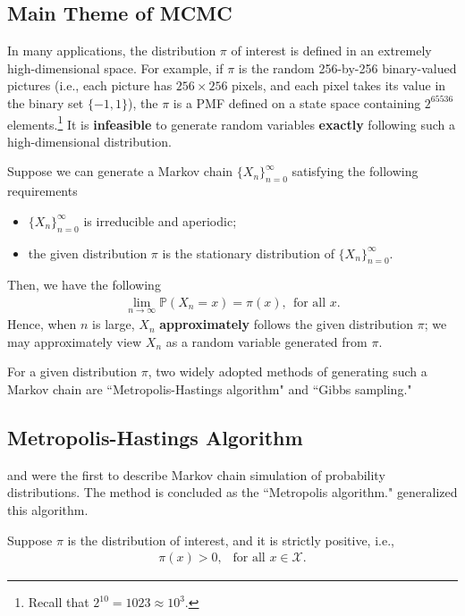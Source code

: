 \documentclass[11pt,letterpaper, leqno]{article}
\numberwithin{equation}{section}
\numberwithin{theorem}{section}
\numberwithin{lemma}{section}
\numberwithin{corollary}{section}
\numberwithin{definition}{section}
\numberwithin{proposition}{section}
\numberwithin{remark}{section}
\numberwithin{example}{section}
\begin{document}
\subsection{Main Theme of MCMC}

In many applications, the distribution $\pi$ of interest is defined in an extremely high-dimensional space. For example, if $\pi$ is the random 256-by-256 binary-valued pictures (i.e., each picture has $256\times 256$ pixels, and each pixel takes its value in the binary set $\{-1,1\}$), the $\pi$ is a PMF defined on a state space containing $2^{65536}$ elements.\footnote{Recall that $2^{10}=1023\approx 10^3$.} It is \textbf{infeasible} to generate random variables \textbf{exactly} following such a high-dimensional distribution.

Suppose we can generate a Markov chain $\{X_n\}_{n=0}^\infty$ satisfying the following requirements
\begin{itemize}
    \item $\{X_n\}_{n=0}^\infty$ is irreducible and aperiodic;
    \item the given distribution $\pi$ is the stationary distribution of $\{X_n\}_{n=0}^\infty$.
\end{itemize}
Then, we have the following
\begin{align*}
    \lim_{n\rightarrow\infty}\mathbb{P}(X_n=x)=\pi(x),\ \ \mbox{for all }x.
\end{align*}
Hence, when $n$ is large, $X_n$ \textbf{approximately} follows the given distribution $\pi$; we may approximately view $X_n$ as a random variable generated from $\pi$.

For a given distribution $\pi$, two widely adopted methods of generating such a Markov chain are ``Metropolis-Hastings algorithm" and ``Gibbs sampling."

\subsection{Metropolis-Hastings Algorithm}

\cite{metropolis1949monte} and \cite{metropolis1953equation} were the first to describe Markov chain simulation of probability distributions. The method is concluded as the ``Metropolis algorithm." \cite{hastings1970monte} generalized this algorithm.

Suppose $\pi$ is the distribution of interest, and it is strictly positive, i.e., 
\begin{align*}
    \pi(x)>0,\ \ \mbox{ for all }x\in\mathcal{X}.
\end{align*}
\end{document}

